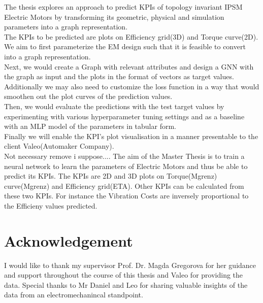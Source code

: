 \documentclass{report} %
\begin{document}
The thesis explores an approach to predict KPIs of topology invariant IPSM Electric Motors by transforming its geometric, physical and simulation parameters into a graph representation. \\
The KPIs to be predicted are plots on Efficiency grid(3D) and Torque curve(2D).\\
We aim to first parameterize the EM design such that it is feasible to convert into a graph representation. \\
Next, we would create a Graph with relevant attributes and design a GNN with the graph as input and the plots in the format of vectors as target values.\\
Additionally we may also need to customize the loss function in a way that would smoothen out the plot curves of the prediction values.\\
Then, we would evaluate the predictions with the test target values by experimenting with various hyperparameter tuning settings and as a baseline with an MLP model of the parameters in tabular form.\\
Finally we will enable the KPI's plot visualisation in a manner presentable to the client Valeo(Automaker Company).\\
Not necessary remove i suppose....
The aim of the Master Thesis is to train a neural network to learn the parameters of Electric Motors and thus be able to predict its KPIs.
The KPIs are 2D and 3D plots on Torque(Mgrenz) curve(Mgrenz) and Efficiency grid(ETA). Other KPIs can be calculated from these two KPIs.
For instance the Vibration Costs are inversely proportional to the Efficieny values predicted. 


\newpage 

\newpage 

\chapter*{Acknowledgement}
I would like to thank my supervisor Prof. Dr. Magda Gregorova for her guidance and support throughout the course of this thesis and Valeo for providing the data.
Special thanks to Mr Daniel and Leo for sharing valuable insights of the data from an electromechanincal standpoint.

\newpage

\newpage

\begin{spacing}{1.2}
    \tableofcontents
\end{spacing}
\end{document}
